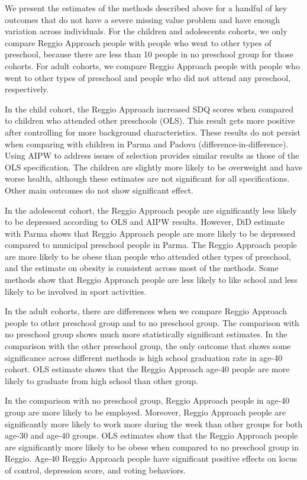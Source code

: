 We present the estimates of the methods described above for a handful of key outcomes that do not have a severe missing value problem and have enough variation across individuals. For the children and adolescents cohorts, we only compare Reggio Approach people with people who went to other types of preschool, because there are less than 10 people in no preschool group for those cohorts. For adult cohorts, we compare Reggio Approach people with people who went to other types of preschool and people who did not attend any preschool, respectively.

In the child cohort, the Reggio Approach increased SDQ scores when compared to children who attended other preschools (OLS). This result gets more positive after controlling for more background characteristics. These results do not persist when comparing with children in Parma and Padova (difference-in-difference). Using AIPW to address issues of selection provides similar results as those of the OLS specification. The children are slightly more likely to be overweight and have worse health, although these estimates are not significant for all specifications. Other main outcomes do not show significant effect.

In the adolescent cohort, the Reggio Approach people are significantly less likely to be depressed according to OLS and AIPW results. However, DiD estimate with Parma shows that Reggio Approach people are more likely to be depressed compared to municipal preschool people in Parma. The Reggio Approach people are more likely to be obese than people who attended other types of preschool, and the estimate on obesity is consistent across most of the methods. Some methods show that Reggio Approach people are less likely to like school and less likely to be involved in sport activities. 

In the adult cohorts, there are differences when we compare Reggio Approach people to other preschool group and to no preschool group. The comparison with no preschool group shows much more statistically significant estimates. In the comparison with the other preschool group, the only outcome that shows some significance across different methods is high school graduation rate in age-40 cohort. OLS estimate shows that the Reggio Approach age-40 people are more likely to graduate from high school than other group. 

In the comparison with no preschool group, Reggio Approach people in age-40 group are more likely to be employed. Moreover, Reggio Approach people are significantly more likely to work more during the week than other groups for both age-30 and age-40 groups. OLS estimates show that the Reggio Approach people are significantly more likely to be obese when compared to no preschool group in Reggio. Age-40 Reggio Approach people have significant positive effects on locus of control, depression score, and voting behaviors. 

